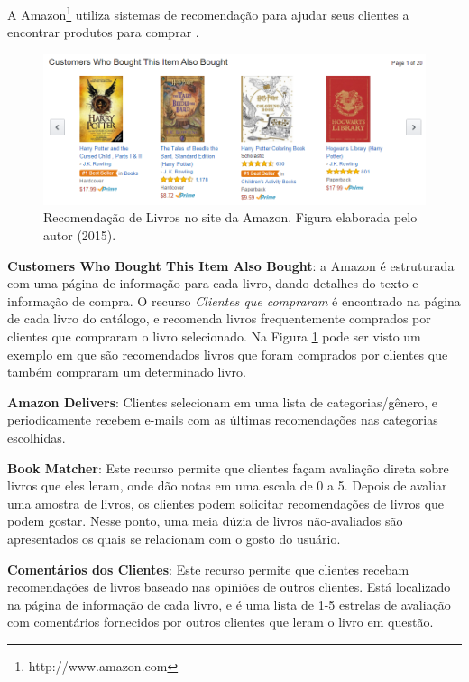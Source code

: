 A Amazon\footnote{http://www.amazon.com} utiliza sistemas de recomendação para ajudar seus clientes a encontrar produtos para comprar \citep{Schafer:1999:RSE:336992.337035}.

\begin{figure}
	\centering
	\includegraphics[scale=0.65]{imagens/amazon.png}
	\caption{Recomendação de Livros no site da Amazon. Figura elaborada pelo autor (2015).}
	\label{fig:amazon}
\end{figure} 

\textbf{Customers Who Bought This Item Also Bought}: a Amazon é estruturada com uma página de informação para cada livro, dando detalhes do texto e informação de compra. O recurso \textit{Clientes que compraram} é encontrado na página de cada livro do catálogo, e recomenda livros frequentemente comprados por clientes que compraram o livro selecionado. Na Figura \ref{fig:amazon} pode ser visto um exemplo em que são recomendados livros que foram comprados por clientes que também compraram um determinado livro.

\textbf{Amazon Delivers}: Clientes selecionam em uma lista de categorias/gênero, e periodicamente recebem e-mails com as últimas recomendações nas categorias escolhidas.

\textbf{Book Matcher}: Este recurso permite que clientes façam avaliação direta sobre livros que eles leram, onde dão notas em uma escala de 0 a 5. Depois de avaliar uma amostra de livros, os clientes podem solicitar recomendações de livros que podem gostar. Nesse ponto, uma meia dúzia de livros não-avaliados são apresentados os quais se relacionam com o gosto do usuário.

\textbf{Comentários dos Clientes}: Este recurso permite que clientes recebam recomendações de livros baseado nas opiniões de outros clientes. Está localizado na página de informação de cada livro, e é uma lista de 1-5 estrelas de avaliação com comentários fornecidos por outros clientes que leram o livro em questão.

